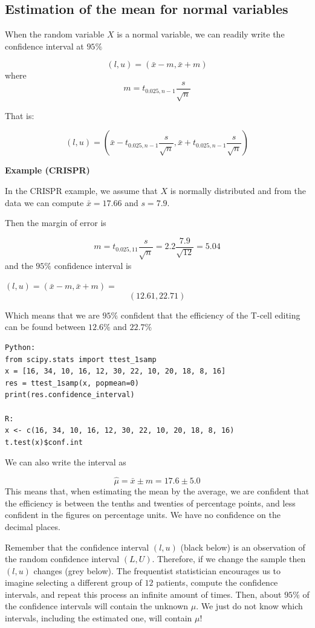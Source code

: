 \documentclass[
]{book}
\begin{document}
\hypertarget{estimation-of-the-mean-for-normal-variables}{%
\subsection{Estimation of the mean for normal variables}\label{estimation-of-the-mean-for-normal-variables}}

When the random variable \(X\) is a normal variable, we can readily write the confidence interval at \(95\%\)

\[(l,u)=(\bar{x} - m, \bar{x} + m)\]
where \[m=t_{0.025, n-1} \frac{s}{\sqrt{n}}\]

That is:

\[(l,u)=(\bar{x} - t_{0.025, n-1} \frac{s}{\sqrt{n}}, \bar{x} + t_{0.025, n-1} \frac{s}{\sqrt{n}})\]

\textbf{Example (CRISPR)}

In the CRISPR example, we assume that \(X\) is normally distributed and from the data we can compute \(\bar{x}= 17.66\) and \(s=7.9\).

Then the margin of error is

\[m=t_{0.025, 11} \frac{s}{\sqrt{n}}=2.2\frac{7.9}{\sqrt{12}}=5.04\]
and the \(95\%\) confidence interval is

\((l,u)=(\bar{x} - m, \bar{x} + m)=\) \[(12.61, 22.71)\]

Which means that we are \(95\%\) confident that the efficiency of the T-cell editing can be found between \(12.6\%\) and \(22.7\%\)

\begin{verbatim}
Python:
from scipy.stats import ttest_1samp
x = [16, 34, 10, 16, 12, 30, 22, 10, 20, 18, 8, 16]
res = ttest_1samp(x, popmean=0)
print(res.confidence_interval)

R:
x <- c(16, 34, 10, 16, 12, 30, 22, 10, 20, 18, 8, 16)
t.test(x)$conf.int
\end{verbatim}

We can also write the interval as

\[\hat{\mu}=\bar{x}  \pm m =  17.6 \pm 5.0\]
This means that, when estimating the mean by the average, we are confident that the efficiency is between the tenths and twenties of percentage points, and less confident in the figures on percentage units. We have no confidence on the decimal places.

Remember that the confidence interval \((l,u)\) (black below) is an observation of the random confidence interval \((L,U)\). Therefore, if we change the sample then \((l,u)\) changes (grey below). The frequentist statistician encourages us to imagine selecting a different group of \(12\) patients, compute the confidence intervals, and repeat this process an infinite amount of times. Then, about \(95\%\) of the confidence intervals will contain the unknown \(\mu\). We just do not know which intervals, including the estimated one, will contain \(\mu\)!
\end{document}
